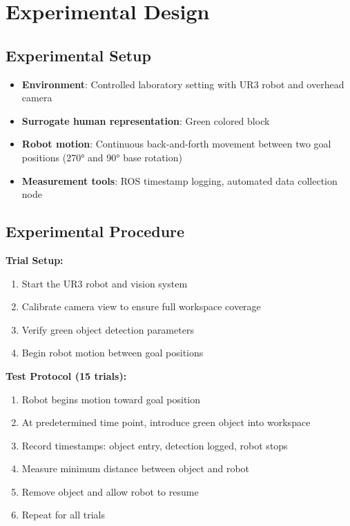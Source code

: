 \documentclass[11pt,letterpaper]{article}
\begin{document}
\section{Experimental Design}

\subsection{Experimental Setup}
\begin{itemize}[leftmargin=*]
    \item \textbf{Environment}: Controlled laboratory setting with UR3 robot and overhead camera
    \item \textbf{Surrogate human representation}: Green colored block
    \item \textbf{Robot motion}: Continuous back-and-forth movement between two goal positions (270° and 90° base rotation)
    \item \textbf{Measurement tools}: ROS timestamp logging, automated data collection node
\end{itemize}

\subsection{Experimental Procedure}

\textbf{Trial Setup:}
\begin{enumerate}[leftmargin=*]
    \item Start the UR3 robot and vision system
    \item Calibrate camera view to ensure full workspace coverage
    \item Verify green object detection parameters
    \item Begin robot motion between goal positions
\end{enumerate}

\textbf{Test Protocol (15 trials):}
\begin{enumerate}[leftmargin=*]
    \item Robot begins motion toward goal position
    \item At predetermined time point, introduce green object into workspace
    \item Record timestamps: object entry, detection logged, robot stops
    \item Measure minimum distance between object and robot
    \item Remove object and allow robot to resume
    \item Repeat for all trials
\end{enumerate}
\end{document}
